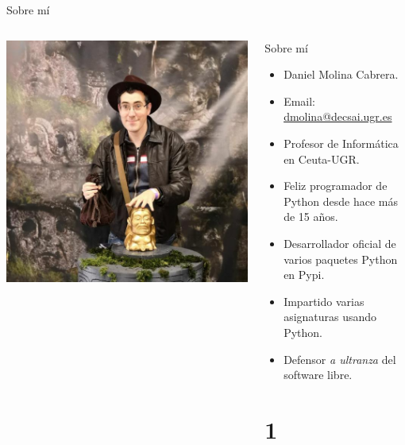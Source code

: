 \documentclass[bigger,unknownkeysallowed]{beamer}
\begin{document}
\begin{frame}[label={sec:orge018b29}]{Sobre mí}
\begin{columns}
\begin{column}{0.3\columnwidth}
\begin{center}
\includegraphics[width=\textwidth]{me.jpg}
\end{center}
\end{column}
\begin{column}{0.7\columnwidth}
\begin{block}{Sobre mí}
\begin{itemize}
\item Daniel Molina Cabrera.

\item Email: \href{mailto:dmolina@decsai.ugr.es}{dmolina@decsai.ugr.es}

\item Profesor de Informática en Ceuta-UGR.

\item Feliz programador de Python desde hace más de 15 años.

\item Desarrollador oficial de varios paquetes Python en Pypi.

\item Impartido varias asignaturas usando Python.

\item Defensor \emph{a ultranza} del software libre.
\end{itemize}


\part{1}
\end{block}
\end{column}
\end{columns}
\end{frame}
\end{document}
